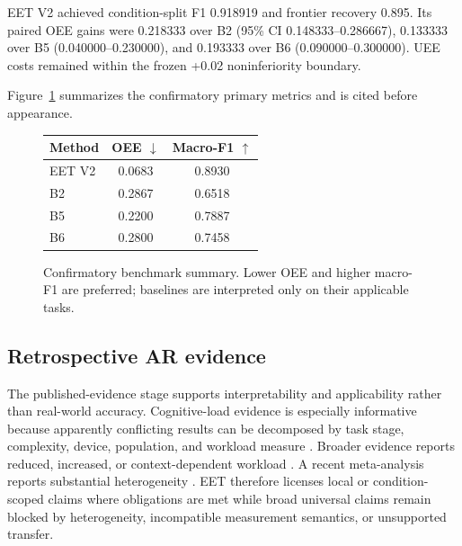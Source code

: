 \documentclass[journal]{IEEEtran}
\begin{document}
EET V2 achieved condition-split F1 0.918919 and frontier recovery 0.895. Its paired OEE gains were 0.218333 over B2 (95\% CI 0.148333--0.286667), 0.133333 over B5 (0.040000--0.230000), and 0.193333 over B6 (0.090000--0.300000). UEE costs remained within the frozen +0.02 noninferiority boundary.

Figure~\ref{fig:bench} summarizes the confirmatory primary metrics and is cited before appearance.
\begin{figure}[H]
\centering
\setlength{\tabcolsep}{4pt}
\begin{tabular}{lcc}
\toprule
Method & OEE $\downarrow$ & Macro-F1 $\uparrow$\\
\midrule
EET V2 & 0.0683 & 0.8930\\
B2 & 0.2867 & 0.6518\\
B5 & 0.2200 & 0.7887\\
B6 & 0.2800 & 0.7458\\
\bottomrule
\end{tabular}
\caption{Confirmatory benchmark summary. Lower OEE and higher macro-F1 are preferred; baselines are interpreted only on their applicable tasks.}
\label{fig:bench}
\end{figure}

\subsection{Retrospective AR evidence}
The published-evidence stage supports interpretability and applicability rather than real-world accuracy. Cognitive-load evidence is especially informative because apparently conflicting results can be decomposed by task stage, complexity, device, population, and workload measure \cite{Baumeister2017CognitiveCost,Yang2019AssemblyCognitiveLoad,AticiUlusu2021CognitiveLoad,Drouot2022IndustrialAssembly,Seeliger2023QualityInspection}. Broader evidence reports reduced, increased, or context-dependent workload \cite{Alessa2023Neurophysiological,Cox2025ClinicalAR,Sahoo2026LaserProjection,Mohanty2025PupilDilationAR,Kagami2026TagAlong}. A recent meta-analysis reports substantial heterogeneity \cite{Zhu2026CognitiveLoad}. EET therefore licenses local or condition-scoped claims where obligations are met while broad universal claims remain blocked by heterogeneity, incompatible measurement semantics, or unsupported transfer.
\end{document}

